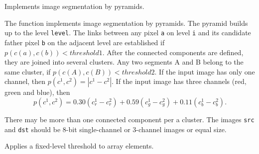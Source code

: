 Implements image segmentation by pyramids.


\begin{description}
\end{description}

The function implements image segmentation by pyramids. The pyramid builds up to the level \texttt{level}. The links between any pixel \texttt{a} on level \texttt{i} and its candidate father pixel \texttt{b} on the adjacent level are established if
$p(c(a),c(b))<threshold1$.
After the connected components are defined, they are joined into several clusters.
Any two segments A and B belong to the same cluster, if $p(c(A),c(B))<threshold2$.
If the input image has only one channel, then $p(c^1,c^2)=|c^1-c^2|$.
If the input image has three channels (red, green and blue), then
\[
  p(c^1,c^2) = 0.30 (c^1_r - c^2_r) +
               0.59 (c^1_g - c^2_g) +
               0.11 (c^1_b - c^2_b).
\]

There may be more than one connected component per a cluster. The images \texttt{src} and \texttt{dst} should be 8-bit single-channel or 3-channel images or equal size.

Applies a fixed-level threshold to array elements.


